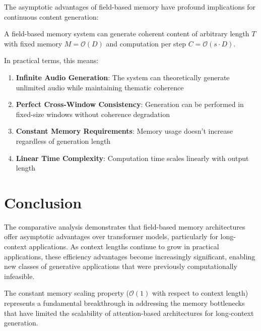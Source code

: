 The asymptotic advantages of field-based memory have profound implications for continuous content generation:

\begin{theorem}
A field-based memory system can generate coherent content of arbitrary length $T$ with fixed memory $M = \mathcal{O}(D)$ and computation per step $C = \mathcal{O}(s \cdot D)$.
\end{theorem}

In practical terms, this means:

\begin{enumerate}
    \item \textbf{Infinite Audio Generation}: The system can theoretically generate unlimited audio while maintaining thematic coherence
    \item \textbf{Perfect Cross-Window Consistency}: Generation can be performed in fixed-size windows without coherence degradation
    \item \textbf{Constant Memory Requirements}: Memory usage doesn't increase regardless of generation length
    \item \textbf{Linear Time Complexity}: Computation time scales linearly with output length
\end{enumerate}

\section{Conclusion}

The comparative analysis demonstrates that field-based memory architectures offer asymptotic advantages over transformer models, particularly for long-context applications. As context lengths continue to grow in practical applications, these efficiency advantages become increasingly significant, enabling new classes of generative applications that were previously computationally infeasible.

The constant memory scaling property ($\mathcal{O}(1)$ with respect to context length) represents a fundamental breakthrough in addressing the memory bottlenecks that have limited the scalability of attention-based architectures for long-context generation.